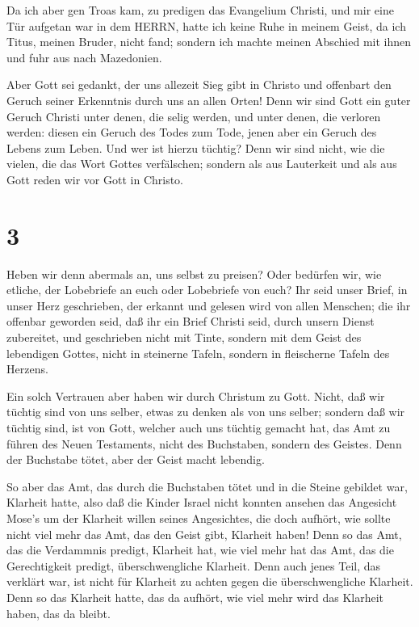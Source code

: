  Da ich aber gen Troas kam, zu predigen das Evangelium
Christi, und mir eine Tür aufgetan war in dem HERRN,  hatte
ich keine Ruhe in meinem Geist, da ich Titus, meinen Bruder, nicht fand;
sondern ich machte meinen Abschied mit ihnen und fuhr aus nach
Mazedonien.

 Aber Gott sei gedankt, der uns allezeit Sieg gibt in
Christo und offenbart den Geruch seiner Erkenntnis durch uns an allen
Orten!  Denn wir sind Gott ein guter Geruch Christi unter
denen, die selig werden, und unter denen, die verloren werden:
 diesen ein Geruch des Todes zum Tode, jenen aber ein
Geruch des Lebens zum Leben. Und wer ist hierzu tüchtig? 
Denn wir sind nicht, wie die vielen, die das Wort Gottes verfälschen;
sondern als aus Lauterkeit und als aus Gott reden wir vor Gott in
Christo.

\hypertarget{section-2}{%
\section{3}\label{section-2}}

 Heben wir denn abermals an, uns selbst zu preisen? Oder
bedürfen wir, wie etliche, der Lobebriefe an euch oder Lobebriefe von
euch?  Ihr seid unser Brief, in unser Herz geschrieben, der
erkannt und gelesen wird von allen Menschen;  die ihr
offenbar geworden seid, daß ihr ein Brief Christi seid, durch unsern
Dienst zubereitet, und geschrieben nicht mit Tinte, sondern mit dem
Geist des lebendigen Gottes, nicht in steinerne Tafeln, sondern in
fleischerne Tafeln des Herzens.

 Ein solch Vertrauen aber haben wir durch Christum zu Gott.
 Nicht, daß wir tüchtig sind von uns selber, etwas zu denken
als von uns selber; sondern daß wir tüchtig sind, ist von Gott,
 welcher auch uns tüchtig gemacht hat, das Amt zu führen des
Neuen Testaments, nicht des Buchstaben, sondern des Geistes. Denn der
Buchstabe tötet, aber der Geist macht lebendig.

 So aber das Amt, das durch die Buchstaben tötet und in die
Steine gebildet war, Klarheit hatte, also daß die Kinder Israel nicht
konnten ansehen das Angesicht Mose's um der Klarheit willen seines
Angesichtes, die doch aufhört,  wie sollte nicht viel mehr
das Amt, das den Geist gibt, Klarheit haben!  Denn so das
Amt, das die Verdammnis predigt, Klarheit hat, wie viel mehr hat das
Amt, das die Gerechtigkeit predigt, überschwengliche Klarheit.
 Denn auch jenes Teil, das verklärt war, ist nicht für
Klarheit zu achten gegen die überschwengliche Klarheit. 
Denn so das Klarheit hatte, das da aufhört, wie viel mehr wird das
Klarheit haben, das da bleibt.

